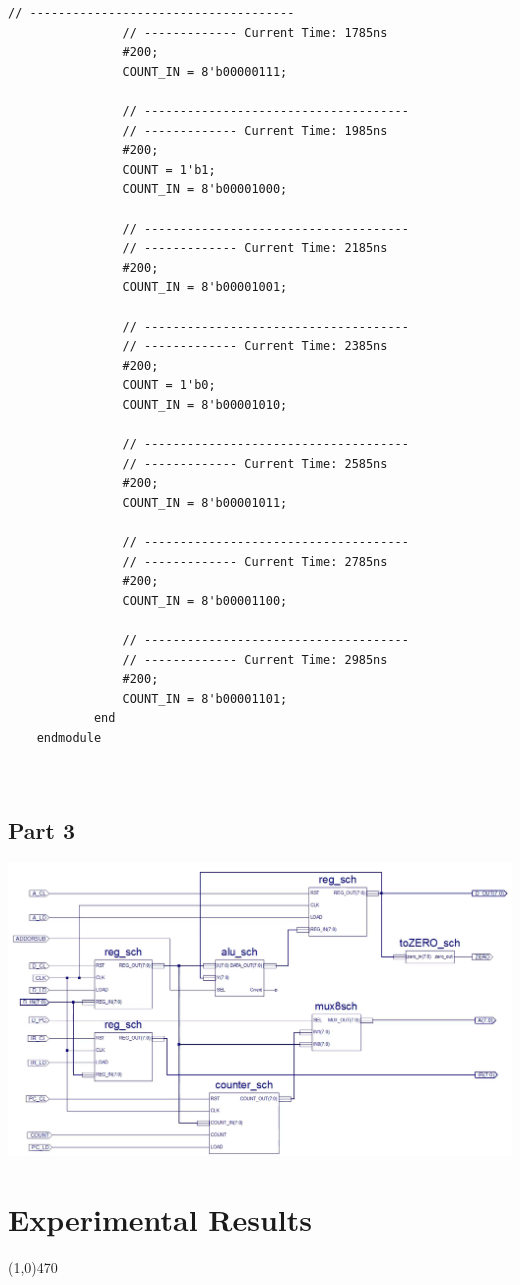 \documentclass[12pt]{article}
\begin{document}
\begin{Verbatim}[frame=single, fontsize=\small]
				// -------------------------------------
				// ------------- Current Time: 1785ns 
				#200;
				COUNT_IN = 8'b00000111;
				
				// -------------------------------------
				// ------------- Current Time: 1985ns 
				#200;
				COUNT = 1'b1;
				COUNT_IN = 8'b00001000;
				
				// -------------------------------------
				// ------------- Current Time: 2185ns 
				#200;
				COUNT_IN = 8'b00001001;
				
				// -------------------------------------
				// ------------- Current Time: 2385ns 
				#200;
				COUNT = 1'b0;
				COUNT_IN = 8'b00001010;
				
				// -------------------------------------
				// ------------- Current Time: 2585ns 
				#200;
				COUNT_IN = 8'b00001011;
				
				// -------------------------------------
				// ------------- Current Time: 2785ns 
				#200;
				COUNT_IN = 8'b00001100;
				
				// -------------------------------------
				// ------------- Current Time: 2985ns 
				#200;
				COUNT_IN = 8'b00001101;
			end 
	endmodule

			
		\end{Verbatim}
\newpage
	\subsection{Part 3}
		
		\begin{center}
			\includegraphics[scale=.32]{datapath.png}
		\end{center}
		
		
			
\section{Experimental Results}\vspace{-.7cm} \line(1,0){470}
\end{document}
